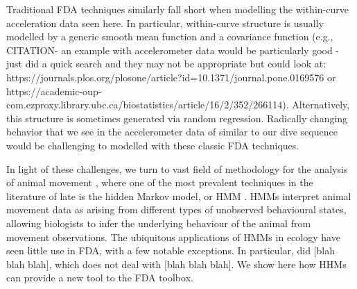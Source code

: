 Traditional FDA techniques similarly fall short when modelling the within-curve acceleration data seen here. In particular, within-curve structure is usually modelled by a generic smooth mean function and a covariance function (e.g., CITATION- an example with accelerometer data would be particularly good - just did a quick search and they may not be appropriate but could look at: https://journals.plos.org/plosone/article?id=10.1371/journal.pone.0169576 or https://academic-oup-com.ezproxy.library.ubc.ca/biostatistics/article/16/2/352/266114). Alternatively, this structure is sometimes generated via random regression.  Radically changing behavior that we see in the accelerometer data of similar to our dive sequence would be challenging to modelled with these classic FDA techniques.

In light of these challenges, we turn to vast field of methodology for the analysis of animal movement \citep{Hooten:2017,Mcclintock:2020}, where one of the most prevalent techniques in the literature of late is the hidden Markov model, or HMM \citep{Patterson:2017}. HMMs interpret animal movement data as arising from different types of unobserved behavioural states, allowing biologists to infer the underlying behaviour of the animal from movement observations. The ubiquitous applications of HMMs in ecology have seen little use in FDA, with a few notable exceptions. In particular,  \citet{Langrock:2018} did [blah blah blah], which does not deal with [blah blah blah]. We show here how HHMs can provide a new tool to the FDA toolbox.

%

